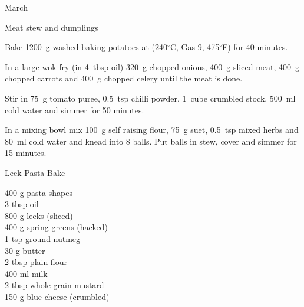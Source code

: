 \begin{menu}{March}
\begin{recipe}{2}{Meat stew and dumplings}
\begin{ingredients}
		\end{ingredients}
	
	
	
    \begin{instructions}
    \item 
      Bake 1200~g washed baking potatoes
      at
      (240$^{\circ}$C, Gas 9, 475$^{\circ}$F) for 40 minutes.
    \item 
        In a large wok fry
        (in 4~tbsp  oil)
        320~g chopped onions,
        400~g sliced meat,
        400~g chopped carrots
        and
        400~g chopped celery
        until the meat is done.
      \item 
        Stir in
        75~g  tomato puree,
        0.5~tsp  chilli powder,
        1~cube crumbled stock,
        500~ml  cold water
        and simmer for 50 minutes.
      \item 
        In a mixing bowl mix
        100~g  self raising flour,
        75~g  suet,
        0.5~tsp  mixed herbs
        and
        80~ml  cold water
        and knead into 8 balls.
        Put balls in stew, cover and
        simmer for 15 minutes.
      
    \end{instructions}
    \end{recipe}%
  
    \begin{recipe}{2}{Leek Pasta Bake}%
		\begin{ingredients}
		400 g pasta shapes  \\
	3 tbsp oil  \\
	800 g leeks (sliced) \\
	400 g spring greens (hacked) \\
	1 tsp ground nutmeg  \\
	30 g butter  \\
	2 tbsp plain flour  \\
	400 ml milk  \\
	2 tbsp whole grain mustard  \\
	150 g blue cheese (crumbled) \\
	
		\end{ingredients}
	

\end{recipe}
\end{menu}
